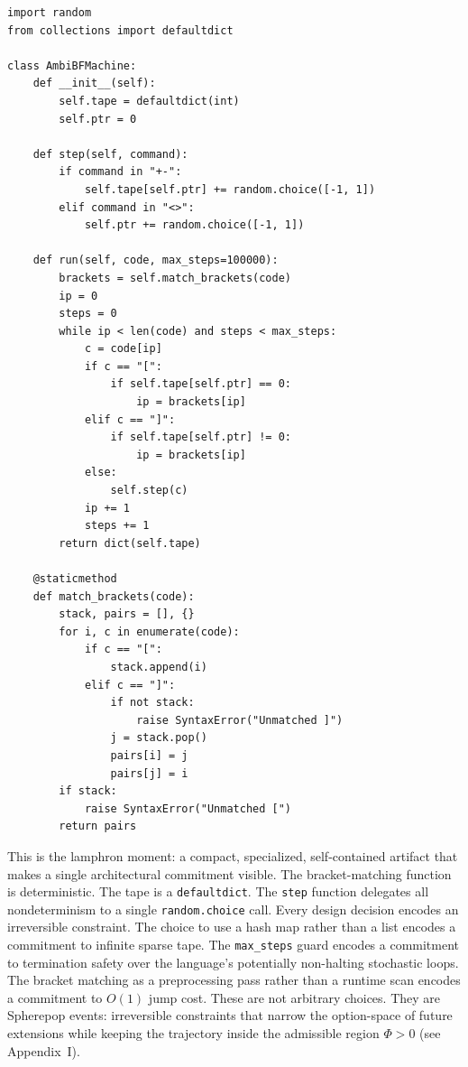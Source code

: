 \documentclass[12pt]{article}
\begin{document}
\begin{lstlisting}
import random
from collections import defaultdict

class AmbiBFMachine:
    def __init__(self):
        self.tape = defaultdict(int)
        self.ptr = 0

    def step(self, command):
        if command in "+-":
            self.tape[self.ptr] += random.choice([-1, 1])
        elif command in "<>":
            self.ptr += random.choice([-1, 1])

    def run(self, code, max_steps=100000):
        brackets = self.match_brackets(code)
        ip = 0
        steps = 0
        while ip < len(code) and steps < max_steps:
            c = code[ip]
            if c == "[":
                if self.tape[self.ptr] == 0:
                    ip = brackets[ip]
            elif c == "]":
                if self.tape[self.ptr] != 0:
                    ip = brackets[ip]
            else:
                self.step(c)
            ip += 1
            steps += 1
        return dict(self.tape)

    @staticmethod
    def match_brackets(code):
        stack, pairs = [], {}
        for i, c in enumerate(code):
            if c == "[":
                stack.append(i)
            elif c == "]":
                if not stack:
                    raise SyntaxError("Unmatched ]")
                j = stack.pop()
                pairs[i] = j
                pairs[j] = i
        if stack:
            raise SyntaxError("Unmatched [")
        return pairs
\end{lstlisting}

This is the lamphron moment: a compact, specialized, self-contained artifact
that makes a single architectural commitment visible. The bracket-matching
function is deterministic. The tape is a \texttt{defaultdict}. The
\texttt{step} function delegates all nondeterminism to a single
\texttt{random.choice} call. Every design decision encodes an irreversible
constraint. The choice to use a hash map rather than a list encodes a
commitment to infinite sparse tape. The \texttt{max\_steps} guard encodes a
commitment to termination safety over the language's potentially non-halting
stochastic loops. The bracket matching as a preprocessing pass rather than a
runtime scan encodes a commitment to $O(1)$ jump cost. These are not arbitrary
choices. They are Spherepop events: irreversible constraints that narrow the
option-space of future extensions while keeping the trajectory inside the
admissible region $\Phi > 0$ (see Appendix~I).
\end{document}
